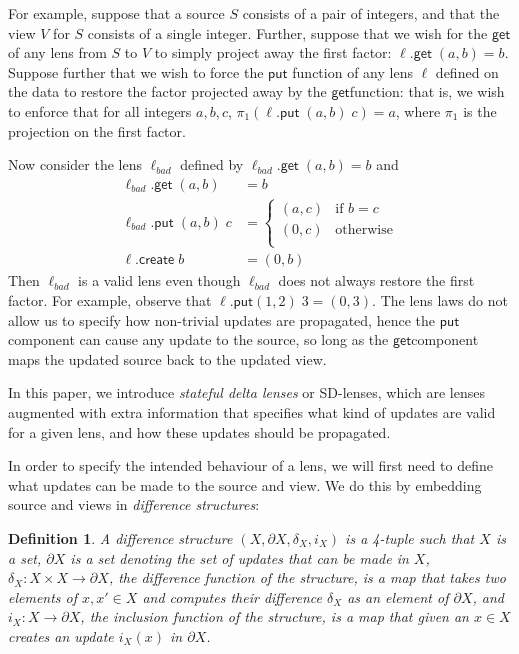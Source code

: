\documentclass[acmsmall,review,anonymous]{acmart}\settopmatter{printfolios=true,printccs=false,printacmref=false}
\newtheorem{definition}{Definition}
\newcommand{\kw}[1]{\ensuremath{\mathsf{#1}}}
\newcommand{\get}{\ensuremath{\kw{get}}}
\newcommand{\pput}{\ensuremath{\kw{put}}}
\newcommand{\create}{\ensuremath{\kw{create}}}
\begin{document}
For example, suppose that a source $S$ consists of a pair of integers, and
that the view $V$ for $S$ consists of a single integer. Further, suppose that we
wish for the \get of any lens from $S$ to $V$ to simply project away
the first factor:
$\ell.\get \; (a, b) = b$. Suppose further that we wish to force the \pput
function of any lens $\ell$ defined on the data to restore the factor projected
away by the \get function: that is, we wish to enforce that for
all integers $a, b, c$, $\pi_1(\ell.\pput \; (a, b) \; c) = a$, where $\pi_1$ is
the projection on the first factor.

Now consider the lens $\ell_{bad}$ defined by $\ell_{bad}.\get \; (a, b) = b$
and
\begin{align*}
\ell_{bad}.\get \; (a, b) &= b\\
\ell_{bad}.\pput \; (a, b) \; c &= \begin{cases}
(a, c) & \text{if }b = c\\
(0, c) & \text{otherwise}\\
\end{cases}\\
\ell.\create \; b &= (0,b)
\end{align*}
Then $\ell_{bad}$ is a valid lens even though $\ell_{bad}$ does not
always restore the first factor. For example, observe that $\ell.\pput (1, 2) \;
3 = (0,3)$. The lens laws do not allow us to specify how non-trivial updates are
propagated, hence the \pput component can cause any update to the source, so
long as the \get component maps the updated source back to the updated view.

In this paper, we introduce {\em stateful delta lenses} or SD-lenses, which are
lenses augmented with extra information that specifies what kind of updates are
valid for a given lens, and how these updates should be propagated.

In order to specify the intended behaviour of a lens, we will first need to
define what updates can be made to the source and view. We do this by embedding
source and views in {\em difference structures}:
\begin{definition}
A difference structure $(X, \partial X, \delta_X, i_X)$ is a 4-tuple such that
$X$ is a set, $\partial X$ is a set denoting the set of updates that can be
made in $X$, $\delta_X : X \times X \longrightarrow \partial X$, the {\em
difference function} of the structure, is a map that takes two elements of $x,
x' \in X$ and computes their difference $\delta_X$ as an element of $\partial
X$, and $i_X : X \longrightarrow \partial X$, the {\em inclusion function} of
the structure, is a map that given an $x \in X$ creates an update $i_X(x)$ in
$\partial X$.
\end{definition}
\end{document}
